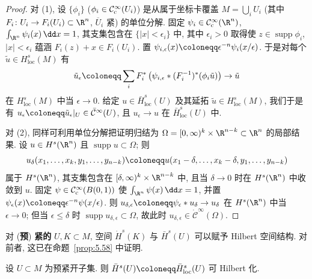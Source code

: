 \begin{proof}
对 (1), 设 $\{\phi_i\}$ ($\phi_i \in \mathcal{C}_{\mathrm{c}}^\infty(U_i)$) 是从属于坐标卡覆盖 $M = \bigcup_i U_i$ (其中 $F_i \colon U_i \to F_i(U_i) \subset \R^n$, $\overline{U}_i$ 紧) 的单位分解. 固定 $\psi_i \in \SmoothComp(\R^n)$, $\int_{\R^n} \psi_i(x) \, \dd x = 1$, 其支集包含在 $\{|x| < \epsilon_i\}$ 中, 其中 $\epsilon_i > 0$ 取得使 $z \in \operatorname{supp} \phi_i$, $|x| < \epsilon_i$ 蕴涵 $F_i(z) + x \in F_i(U_i)$. 置 $\psi_{i,\epsilon}(x) \defeq \epsilon^{-n} \psi_i(x/\epsilon)$. 于是对每个 $\tilde u \in H_{\mathrm{loc}}^s(M)$ 有
\begin{equation}\label{eq:9.68}
    \tilde u_\epsilon \defeq \sum_i F_i^*\left( \psi_{i,\epsilon} * (F_i^{-1})^*(\phi_i \tilde u) \right) \to \tilde u
\end{equation}
在 $H_{\mathrm{loc}}^s(M)$ 中当 $\epsilon \to 0$. 给定 $u \in \bar{H}_{\mathrm{loc}}^s(U)$ 及其延拓 $\tilde u \in H_{\mathrm{loc}}^s(M)$, 我们于是有 $u_\epsilon \defeq \tilde u_\epsilon|_U \in \bar{\mathcal{C}}^\infty(U)$, 且 $u_\epsilon \to u$ 在 $\bar{H}_{\mathrm{loc}}^s(U)$ 中.

对 (2), 同样可利用单位分解把证明归结为 $\Omega = [0, \infty)^k \times \R^{n-k} \subset \R^n$ 的局部结果. 设 $u \in H^s(\R^n)$ 且 $\operatorname{supp} u \subset \Omega$; 则
\begin{equation}\label{eq:9.69}
    u_\delta(x_1, \ldots, x_k, y_1, \ldots, y_{n-k}) \defeq u(x_1 - \delta, \ldots, x_k - \delta, y_1, \ldots, y_{n-k})
\end{equation}
属于 $H^s(\R^n)$, 其支集包含在 $[\delta, \infty)^k \times \R^{n-k}$ 中, 且当 $\delta \to 0$ 时在 $H^s(\R^n)$ 中收敛到 $u$. 固定 $\psi \in \mathcal{C}_{\mathrm{c}}^\infty(B(0,1))$ 使 $\int_{\R^n} \psi(x) \, \dd x = 1$, 并置 $\psi_\epsilon(x) \defeq \epsilon^{-n} \psi(x/\epsilon)$. 则 $u_{\delta,\epsilon} \defeq \psi_\epsilon * u_\delta \to u_\delta$ 在 $H^s(\R^n)$ 中当 $\epsilon \to 0$; 但当 $\epsilon \le \delta$ 时 $\operatorname{supp} u_{\delta,\epsilon} \subset \Omega$, 故此时 $u_{\delta,\epsilon} \in \dot{\mathcal{C}}^\infty(\Omega)$.
\end{proof}

对 (\textbf{预}) \textbf{紧的} $U, K \subset M$, 空间 $\dot{H}^s(K)$ 与 $\bar{H}^s(U)$ 可以赋予 Hilbert 空间结构. 对前者, 这已在命题~\ref{prop:5.58} 中证明.

\begin{proposition}\label{prop:9.23}
设 $U \subset M$ 为预紧开子集. 则 $\bar{H}^s(U) \defeq \bar{H}_{\mathrm{loc}}^s(U)$ 可 Hilbert 化.
\end{proposition}

